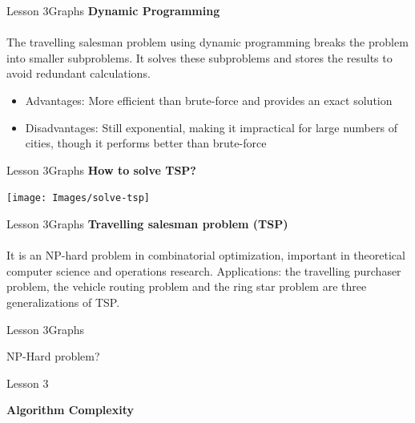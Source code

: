 \documentclass[aspectratio=1610]{beamer}
\begin{document}
\begin{frame}{Lesson 3}{Graphs}
\LARGE
\textbf{Dynamic Programming}\\~\\
\Large
The travelling salesman problem using dynamic programming breaks the
problem into smaller subproblems. It solves these subproblems and
stores the results to avoid redundant calculations.
\begin{itemize}
	\item Advantages: More efficient than brute-force and provides an exact solution
	\item Disadvantages:  Still exponential, making it impractical for large numbers of cities, though it performs better than brute-force
\end{itemize}
\end{frame}


\begin{frame}{Lesson 3}{Graphs}
\LARGE
\textbf{How to solve TSP?}\\
\begin{center}
\texttt{[image: Images/solve-tsp]}
\end{center}
\end{frame}


\begin{frame}{Lesson 3}{Graphs}
\LARGE
\textbf{Travelling salesman problem (TSP)}\\~\\
\Large
It is an \alert{NP-hard} problem in combinatorial optimization,
important in theoretical computer science and operations research.
Applications: the travelling purchaser problem, the vehicle routing
problem and the ring star problem are three generalizations of TSP.
\end{frame}



\begin{frame}{Lesson 3}{Graphs}
\Huge
\begin{center}
NP-Hard problem?
\end{center}
\end{frame}



\begin{frame}{Lesson 3}{}
\begin{center}
\Huge \textbf{Algorithm Complexity}
\end{center}
\end{frame}
\end{document}
